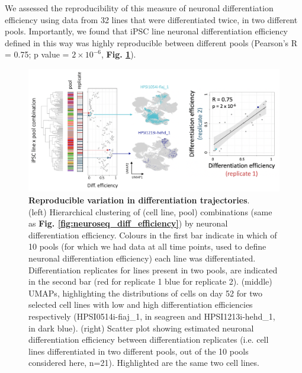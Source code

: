 \clearpage

We assessed the reproducibility of this measure of neuronal differentiation efficiency using data from 32 lines that were differentiated twice, in two different pools. 
Importantly, we found that iPSC line neuronal differentiation efficiency defined in this way was highly reproducible between different pools (Pearson's R = 0.75; p value = $2 \times 10^{-6}$, \textbf{Fig. \ref{fig:neuroseq_diff_eff_replication}}).

\begin{figure}[h]
\centering
\includegraphics[width=15.5cm]{Chapter5/Fig/neuroseq_diff_eff_replication.png}
\caption[Reproducible neuronal differentiation efficiency]{\textbf{Reproducible variation in differentiation trajectories}.\\
(left) Hierarchical clustering of (cell line, pool) combinations (same as \textbf{Fig. \ref{fig:neuroseq_diff_efficiency}}) by neuronal differentiation efficiency. 
Colours in the first bar indicate in which of 10 pools (for which we had data at all time points, used to define neuronal differentiation efficiency) each line was differentiated. 
Differentiation replicates for lines present in two pools, are indicated in the second bar (red for replicate 1 blue for replicate 2).
(middle) UMAPs, highlighting the distributions of cells on day 52 for two selected cell lines with low and high differentiation efficiencies respectively (HPSI0514i-fiaj\_1, in seagreen and HPSI1213i-hehd\_1, in dark blue).
(right) Scatter plot showing estimated neuronal differentiation efficiency between differentiation replicates (i.e. cell lines differentiated in two different pools, out of the 10 pools considered here, n=21). 
Highlighted are the same two cell lines.}
\label{fig:neuroseq_diff_eff_replication}
\end{figure}


